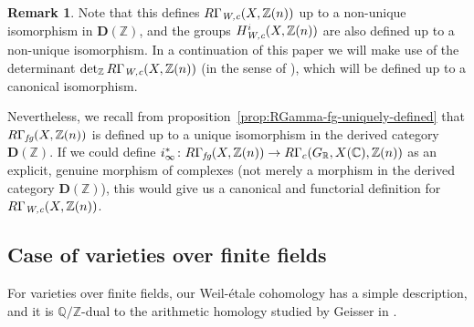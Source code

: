 \documentclass[draft,leqno,12pt]{article}
\theoremstyle{plain}
\theoremstyle{definition}
\newtheorem{remark}[theorem]{\indent\sc Remark}
\newcommand{\ZZ}{\mathbb{Z}}
\newcommand{\QQ}{\mathbb{Q}}
\newcommand{\RR}{\mathbb{R}}
\newcommand{\CC}{\mathbb{C}}
\newcommand{\Wc}{\text{\it W,c}}
\newcommand{\fg}{\text{\it fg}}
\begin{document}
\begin{remark}
  Note that this defines $R\Gamma_\Wc (X,\ZZ(n))$ up to a non-unique isomorphism
  in $\mathbf{D} (\ZZ)$, and the groups $H_\Wc^i (X, \ZZ (n))$ are also defined
  up to a non-unique isomorphism. In a continuation of this paper we will make
  use of the determinant $\det\nolimits_\ZZ R\Gamma_\Wc (X,\ZZ(n))$ (in the
  sense of \cite{Knudsen-Mumford-1976}), which will be defined up to a canonical
  isomorphism.

  Nevertheless, we recall from proposition~\ref{prop:RGamma-fg-uniquely-defined}
  that $R\Gamma_\fg (X, \ZZ (n))$ is defined up to a unique isomorphism in the
  derived category $\mathbf{D} (\ZZ)$. If we could define
  $i_\infty^*\colon R\Gamma_\fg (X, \ZZ(n)) \to R\Gamma_c (G_\RR, X(\CC), \ZZ(n))$
  as an explicit, genuine morphism of complexes (not merely a morphism in the
  derived category $\mathbf{D} (\ZZ)$), this would give us a canonical and
  functorial definition for $R\Gamma_\Wc (X, \ZZ(n))$.
\end{remark}

\subsection*{Case of varieties over finite fields}

For varieties over finite fields, our Weil-\'{e}tale cohomology has a simple
description, and it is $\QQ/\ZZ$-dual to the arithmetic homology studied by
Geisser in \cite{Geisser-2010-arithmetic-homology}.
\end{document}

